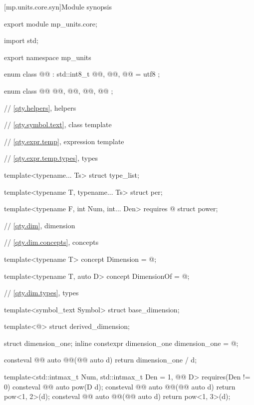 [mp.units.core.syn]{Module  synopsis}
%
\begin{codeblock}
export module mp_units.core;

import std;

export namespace mp_units {

enum class @@ : std::int8_t { @@, @@, @@ = utf8 };

enum class @@ { @@, @@, @@, @@ };

// \ref{qty.helpers}, helpers

// \ref{qty.symbol.text}, class template 

// \ref{qty.expr.temp}, expression template

// \ref{qty.expr.temp.types}, types

template<typename... Ts>
struct type_list;

template<typename T, typename... Ts>
struct per;

template<typename F, int Num, int... Den>
  requires @\seebelownc@
struct power;

// \ref{qty.dim}, dimension

// \ref{qty.dim.concepts}, concepts

template<typename T>
concept Dimension = @\seebelownc@;

template<typename T, auto D>
concept DimensionOf = @\seebelownc@;

// \ref{qty.dim.types}, types

template<symbol_text Symbol>
struct base_dimension;

template<@\seebelownc@>
struct derived_dimension;

struct dimension_one;
inline constexpr dimension_one dimension_one = @\seebelownc@;

consteval @@ auto @@(@@ auto d) { return dimension_one / d; }

template<std::intmax_t Num, std::intmax_t Den = 1, @@ D>
  requires(Den != 0)
consteval @@ auto pow(D d);
consteval @@ auto @@(@@ auto d) { return pow<1, 2>(d); }
consteval @@ auto @@(@@ auto d) { return pow<1, 3>(d); }

}
\end{codeblock}
